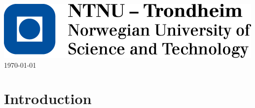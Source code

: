 \documentclass[11pt,twoside,a4paper]{report}
\begin{document}
\begin{titlepage}




\includegraphics{ntnuEnglish.png}\\[1.5cm] %


{\large \today}\\[3cm] %


\vfill %

\end{titlepage}



\begin{abstract}

\end{abstract}

\tableofcontents

\chapter{Introduction}
\end{document}
